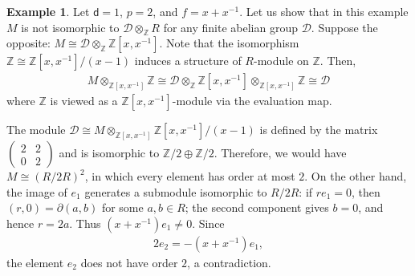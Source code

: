 \documentclass[sn-mathphys-num]{sn-jnl}
\theoremstyle{definition}
\newtheorem{example}[lemma]{Example}
\numberwithin{equation}{section}
\theoremstyle{definition}
\def\CD {{\mathcal D}}
\def\CD {{\mathcal D}}
\def\pd{\partial}
\def\IZ{{\mathbb{Z}}}
\newcommand{\dd}{{\mathsf{d}}} %
\begin{document}
\begin{example}\label{Example_RS_mod_non_invf}
Let $\dd=1$, $p=2$, and $f=x+x^{-1}$. Let us show that in this example $M$ is not isomorphic to $\CD\otimes_{\IZ}R$ for any finite abelian group $\CD$.
Suppose the opposite: $M \cong \CD \otimes_{\IZ} \mathbb{Z}[x, x^{-1}]$. Note that the isomorphism $\mathbb Z\cong \mathbb{Z}[x, x^{-1}] / (x-1) $ induces a structure of  $R$-module on $\mathbb Z$.  Then, 
\begin{align}
 M \otimes_{\mathbb{Z}[x,x^{-1}]} \mathbb{Z} \cong \CD \otimes_{\mathbb{Z}} \mathbb{Z}[x, x^{-1}] \otimes_{\mathbb{Z}[x, x^{-1}]} \mathbb{Z} \cong  \CD
\end{align}
where $\IZ$ is viewed as a $\IZ[x,x^{-1}]$-module via the evaluation map.

The module $\CD\cong M\otimes_{\mathbb{Z}[x,x^{-1}]} \mathbb{Z}[x,x^{-1}]/(x-1)$ is defined by the matrix $\begin{pmatrix}2&2\\0&2\end{pmatrix}$ and is isomorphic to $\mathbb Z/2\oplus\mathbb Z/2$. Therefore, we would have $M\cong(R/2R)^2$, in which every element has order at most $2$. On the other hand, the image of $e_1$ generates a submodule isomorphic to $R/2R$: if $re_1=0$, then $(r,0)=\pd(a,b)$ for some $a,b\in R$; the second component gives $b=0$, and hence $r=2a$. Thus $(x+x^{-1})e_1\neq0$. Since \begin{align} 2e_2=-(x+x^{-1})e_1, \end{align} the element $e_2$ does not have order $2$, a contradiction.
\end{example}
\vspace{3mm}
\end{document}
